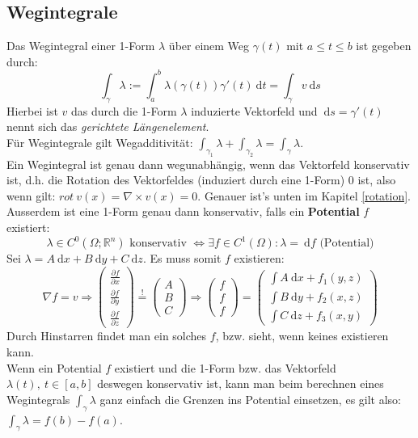 \documentclass[a4paper,10pt]{scrartcl}
\newcommand{\diff}{\ \mathrm{d}}
\begin{document}
\subsection{Wegintegrale}
Das Wegintegral einer 1-Form $\lambda$ über einem Weg $\gamma(t)$ mit $a\leq t \leq b$ ist gegeben durch: 
\begin{equation}
	\int_{\gamma}\lambda :=\int_{a}^{b} \lambda(\gamma(t))\gamma'(t)\diff t = \int_{\gamma} v\diff s
\end{equation} 
Hierbei ist $v$ das durch die 1-Form $\lambda$ induzierte Vektorfeld und $\diff s = \gamma'(t)$ nennt sich das \textit{gerichtete Längenelement}. \\
Für Wegintegrale gilt Wegadditivität: $\int_{\gamma_1}\lambda+ \int_{\gamma_2}\lambda = \int_{\gamma} \lambda$. \\
Ein Wegintegral ist genau dann wegunabhängig, wenn das Vektorfeld konservativ ist, d.h. die Rotation des Vektorfeldes (induziert durch eine 1-Form) 0 ist, also wenn gilt: $rot\ v(x) = \nabla \times v(x)=0$. Genauer ist's unten im Kapitel \ref{rotation}.\\
Ausserdem ist eine 1-Form genau dann konservativ, falls ein \textbf{Potential} $f$ existiert:
\begin{equation}
	\lambda \in C^0(\Omega;\mathbb{R}^n) \text{ konservativ } \Leftrightarrow \exists f \in C^1(\Omega): \lambda = \diff f \text{ (Potential)}
\end{equation}
Sei $\lambda= A\diff x + B \diff y + C \diff z$. Es muss somit $f$ existieren: 
\begin{equation*}
\nabla f = v \Rightarrow 
\begin{pmatrix} 
\frac{\partial f}{\partial x}\\
\frac{\partial f}{\partial y}\\
\frac{\partial f}{\partial z} 
\end{pmatrix}\overset{!}{=}
\begin{pmatrix} A\\B\\C\end{pmatrix}
\Rightarrow
\begin{pmatrix} f\\ f\\ f\end{pmatrix}=
\begin{pmatrix} \int A\diff x + f_1(y,z)\\ \int B\diff y + f_2(x,z) \\ \int C\diff z+ f_3(x,y) \end{pmatrix}
\end{equation*}
Durch Hinstarren findet man ein solches $f$, bzw. sieht, wenn keines existieren kann.\\
Wenn ein Potential $f$ existiert und die 1-Form bzw. das Vektorfeld $\lambda(t), \ t\in[a,b]$ deswegen konservativ ist, kann man beim berechnen eines Wegintegrals $\int_\gamma \lambda$ ganz einfach die Grenzen ins Potential einsetzen, es gilt also: $\int_\gamma \lambda = f(b)-f(a)$.
\end{document}
